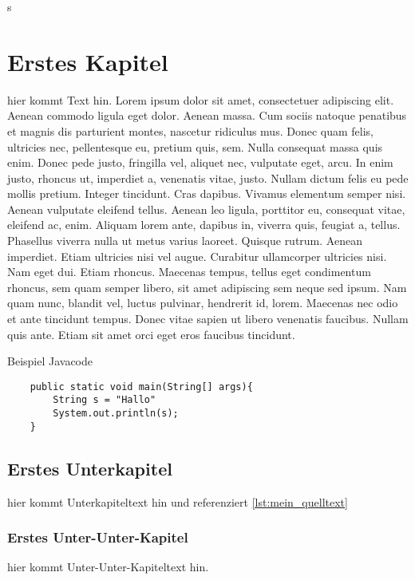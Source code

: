 \documentclass[11pt]{article}
\begin{document}
\tableofcontents
\newpage
\listoffigures
\newpage
\renewcommand*{\listoflistingscaption}{Listingverzeichnis}s
\listoflistings
\newpage

\section{Erstes Kapitel}
hier kommt Text hin.
Lorem ipsum dolor sit amet, consectetuer adipiscing elit. Aenean commodo ligula eget dolor. Aenean massa. Cum sociis natoque penatibus et magnis dis parturient montes, nascetur ridiculus mus. Donec quam felis, ultricies nec, pellentesque eu, pretium quis, sem. Nulla consequat massa quis enim. Donec pede justo, fringilla vel, aliquet nec, vulputate eget, arcu. In enim justo, rhoncus ut, imperdiet a, venenatis vitae, justo. Nullam dictum felis eu pede mollis pretium. Integer tincidunt. Cras dapibus. Vivamus elementum semper nisi. Aenean vulputate eleifend tellus. Aenean leo ligula, porttitor eu, consequat vitae, eleifend ac, enim. Aliquam lorem ante, dapibus in, viverra quis, feugiat a, tellus. Phasellus viverra nulla ut metus varius laoreet. Quisque rutrum. Aenean imperdiet. Etiam ultricies nisi vel augue. Curabitur ullamcorper ultricies nisi. Nam eget dui. Etiam rhoncus. Maecenas tempus, tellus eget condimentum rhoncus, sem quam semper libero, sit amet adipiscing sem neque sed ipsum. Nam quam nunc, blandit vel, luctus pulvinar, hendrerit id, lorem. Maecenas nec odio et ante tincidunt tempus. Donec vitae sapien ut libero venenatis faucibus. Nullam quis ante. Etiam sit amet orci eget eros faucibus tincidunt.

\begin{listing}[H]
    \caption{Beispiel Javacode}
    \label{lst:mein_quelltext}
    \begin{verbatim}
    public static void main(String[] args){
        String s = "Hallo"
        System.out.println(s);
    }
    \end{verbatim}
\end{listing}

\subsection{Erstes Unterkapitel}
hier kommt Unterkapiteltext hin und referenziert \ref{lst:mein_quelltext}

\subsubsection{Erstes Unter-Unter-Kapitel}
hier kommt Unter-Unter-Kapiteltext hin.
\end{document}
